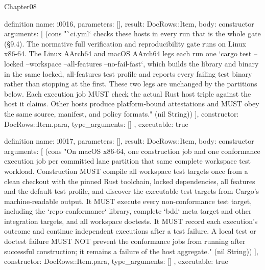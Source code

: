 \begin{lexlean}{Chapter08}
\begin{semanticmodule}
definition{
  name: i0016,
  parameters: [],
  result: DocRows::Item,
  body: constructor{
    arguments: [
      (cons "`ci.yml` checks these hosts in every run that is the whole gate (§9.4). The normative full verification and reproducibility gate runs on Linux x86-64. The Linux AArch64 and macOS AArch64 legs each run one `cargo test --locked --workspace --all-features --no-fail-fast`, which builds the library and binary in the same locked, all-features test profile and reports every failing test binary rather than stopping at the first. These two legs are unchanged by the partitions below. Each execution job MUST check the actual Rust host triple against the host it claims. Other hosts produce platform-bound attestations and MUST obey the same source, manifest, and policy formats." (nil String))
    ],
    constructor: DocRows::Item.para,
    type_arguments: []
  },
  executable: true
}

definition{
  name: i0017,
  parameters: [],
  result: DocRows::Item,
  body: constructor{
    arguments: [
      (cons "On macOS x86-64, one construction job and one conformance execution job per committed lane partition that same complete workspace test workload. Construction MUST compile all workspace test targets once from a clean checkout with the pinned Rust toolchain, locked dependencies, all features and the default test profile, and discover the executable test targets from Cargo's machine-readable output. It MUST execute every non-conformance test target, including the `repo-conformance` library, complete `bdd` meta target and other integration targets, and all workspace doctests. It MUST record each execution's outcome and continue independent executions after a test failure. A local test or doctest failure MUST NOT prevent the conformance jobs from running after successful construction; it remains a failure of the host aggregate." (nil String))
    ],
    constructor: DocRows::Item.para,
    type_arguments: []
  },
  executable: true
}


\end{semanticmodule}
\end{lexlean}
